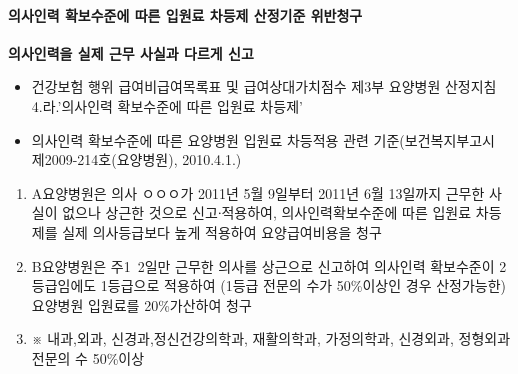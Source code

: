 \paragraph{의사인력 확보수준에 따른 입원료 차등제 산정기준 위반청구}
\textbf{의사인력을 실제 근무 사실과 다르게 신고}
\begin{description}\tightlist
\item[관련근거] 
\begin{itemize}\tightlist
\item 건강보험 행위 급여\cntrdot{}비급여목록표 및 급여상대가치점수 제3부 요양병원 산정지침 4.라.'의사인력 확보수준에 따른 입원료 차등제'
\item 의사인력 확보수준에 따른 요양병원 입원료 차등적용 관련 기준(보건복지부고시 제2009-214호(요양병원), 2010.4.1.)
\end{itemize}

\item[부당사례]
\begin{enumerate}[1)]\tightlist
\item A요양병원은 의사 ㅇㅇㅇ가 2011년 5월 9일부터 2011년 6월 13일까지 근무한 사실이 없으나 상근한 것으로 신고∙적용하여, 의사인력확보수준에 따른 입원료 차등제를 실제 의사등급보다 높게 적용하여 요양급여비용을 청구
\item B요양병원은 주1~2일만 근무한 의사를 상근으로 신고하여 의사인력 확보수준이 2등급임에도 1등급으로 적용하여 (1등급 전문의 수가 50\%이상인 경우 산정가능한) 요양병원 입원료를 20\%가산하여 청구
\item ※ 내과,외과, 신경과,정신건강의학과, 재활의학과, 가정의학과, 신경외과, 정형외과 전문의 수 50\%이상
\end{enumerate}
\end{description}


